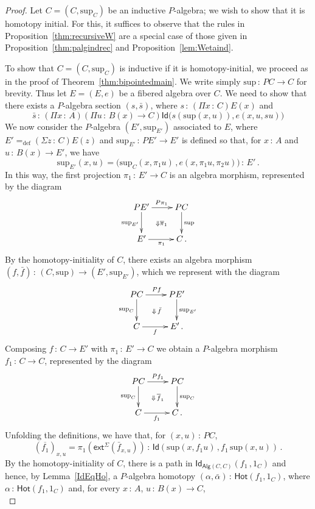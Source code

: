 \documentclass[10pt,a4paper,oneside,reqno]{amsart}
\numberwithin{equation}{section}
\theoremstyle{mythm}
\theoremstyle{mydef}
\theoremstyle{myrmk}
\newcommand{\defeq}{=_{\mathrm{def}}}
\newcommand{\co}{\,{:}\,}
\newcommand{\Hot}{\mathsf{Hot}}
\newcommand{\ext}{\mathsf{ext}}
\newcommand{\Id}{\mathsf{Id}}
\newcommand{\Palg}{\mathsf{Alg}}
\renewcommand{\sup}{\mathrm{sup}}
\begin{document}
\begin{proof}
Let $C = (C, \sup_C)$ be an inductive $P$-algebra; we wish to show that it is homotopy initial.
For this, it suffices to observe that the rules in Proposition~\ref{thm:recursiveW} are a special case of those given in Proposition~\ref{thm:palgindrec} and Proposition~\ref{lem:Wetaind}.

To show that $C = (C, \sup_C)$ is inductive if it is homotopy-initial, we proceed as in the proof of
Theorem~\ref{thm:bipointedmain}. We write simply $\sup \co PC \to C$ for brevity.
Thus let $E = (E, e)$ be a fibered algebra over $C$. We need to show that there
exists a $P$-algebra section $(s, \bar{s})$, where $s \co (\Pi x \co C) E(x)$ and 
\[ 
\bar{s} \co (\Pi x \co A)(\Pi u \co B(x) \to C) \Id \big( s(\sup(x,u)), e(x, u, s u) \big)
\]
We now consider the $P$-algebra $(E', \sup_{E'})$ associated to $E$, where $E' \defeq
(\Sigma z \co C) E(z)$ and $\sup_{E'} \co PE' \to E'$ is defined so that, for $x \co A$ and $u \co B(x) \to E'$, 
we have
\[
\sup_{E'}(x,u) = \big( \sup_C(x,\pi_1  u) \, , e (x,\pi_1  u, \pi_2  u )\big) \co E' \, .
\]
In this way, the first projection $\pi_1 \co E' \to C$  is an algebra morphism, represented by the diagram
\[
\xymatrix{
PE' \ar[d]_{\sup_{E'}}  \ar[r]^{P\pi_1} \ar@{}[dr]|{\Downarrow \overline{\pi}_1} & PC \ar[d]^{\sup}  \\
E' \ar[r]_{\pi_1} & C \, .}
\]
By the homotopy-initiality of $C$, there exists an algebra morphism $(f, \bar{f}) \co (C, \sup)  \to (E', \sup_{E'})$,
which we represent with the diagram
\[
\xymatrix{
PC \ar[r]^{Pf} \ar[d]_-{\sup_{C}} \ar@{}[rd]|{\Downarrow \, \bar{f}} & PE' \ar[d]^{\sup_{E'}} \\ 
C  \ar[r]_-{f} & E' \, .}
 \]
%
Composing $f \co C \to E'$ with $\pi_1 \co E' \to C$ we obtain a $P$-algebra morphism $f_1 \co C \to C$, represented by the diagram
\[
\xymatrix{
PC \ar[r]^{Pf_1} \ar[d]_-{\sup_{C}} \ar@{}[rd]|{\Downarrow \, \overline{f}_1} & PC \ar[d]^{\sup_{C}} \\ 
C  \ar[r]_-{f_1} & C \, .}
 \]
Unfolding the definitions, we have that, for $(x, u) \co PC$, 
\[
(\overline{f_1})_{x,u} =   \pi_1( \ext^\Sigma(\bar{f}_{x,u})) \co \Id(  
\sup(x, f_1 u) \, , f_1 \, \sup(x,u)   ) \, .
\] 
By the homotopy-initiality of $C$,  there is a path in  $\Id_{\Palg(C,C)} ( f_1  \, ,  1_C)$ and hence, 
by Lemma~\ref{IdEqHo}, a $P$-algebra homotopy $(\alpha, \bar{\alpha}) \co \Hot(f_1 , 1_C)$,  where 
$\alpha \co \Hot( f_1 , 1_C)$ and, for every $x \co A$, $u \co B(x)\to C$, 
\begin{equation}

\end{equation}
\end{proof}
\end{document}
